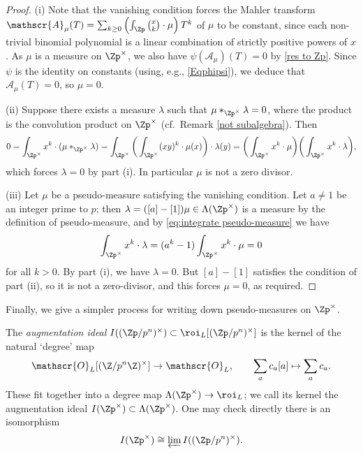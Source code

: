 \documentclass[a4paper,10pt, english, reqno]{smfart}
\numberwithin{equation}{section}
\begin{document}
\begin{proof}
	(i) Note that the vanishing condition forces the Mahler transform $\mathscr{A}_\mu(T) = \sum_{k \geq 0} \left( \int_{\Zp} {x \choose k} \cdot \mu \right) T^k$ of $\mu$ to be constant, since each non-trivial binomial polynomial is a linear combination of strictly positive powers of $x$. As $\mu$ is a measure on $\Zp^\times$, we also have $\psi(\mathscr{A}_\mu)(T) = 0$ by \eqref{res to Zp}. Since $\psi$ is the identity on constants (using, e.g., \eqref{Eqphipsi}), we deduce that $\mathscr{A}_\mu(T) = 0$, so $\mu = 0$.

	
	(ii) Suppose there exists a measure $\lambda$ such that $\mu *_{\Zp^\times} \lambda = 0$, where the product is the convolution product on $\Zp^\times$ (cf.\ Remark \ref{not subalgebra}). Then
	\[0 = \int_{\Zp^\times}x^k \cdot (\mu *_{\Zp^\times} \lambda) = \int_{\Zp^\times} \bigg( \int_{\Zp^\times} (xy)^k \cdot \mu(x) \bigg) \cdot \lambda(y) = \bigg(\int_{\Zp^\times}x^k \cdot\mu \bigg) \bigg( \int_{\Zp^\times}x^k \cdot\lambda \bigg),\]
	which forces $\lambda = 0$ by part (i). In particular $\mu$ is not a zero divisor.

	(iii) Let $\mu$ be a pseudo-measure satisfying the vanishing condition. Let $a \neq 1$ be an integer prime to $p$; then  $\lambda = ([a] - [1])\mu \in \Lambda(\Zp^\times)$ is a measure by the definition of pseudo-measure, and by \eqref{eq:integrate pseudo-measure} we have
	\[
	\int_{\Zp^\times} x^k \cdot \lambda = (a^k-1) \int_{\Zp^\times} x^k \cdot \mu = 0
	\]
	for all $k > 0$. By part (i), we have $\lambda = 0$. But $[a] - [1]$ satisfies the condition of part (ii), so it is not a zero-divisor, and this forces $\mu = 0$, as required.
\end{proof}

Finally, we give a simpler process for writing down pseudo-measures on $\Zp^\times$. 

\begin{definition} \label{DefAugmentationIdealFiniteLevel}
	The \emph{augmentation ideal} $I((\Zp/p^n)^\times) \subset \roi_L[(\Zp/p^n)^\times]$ is the kernel of the natural `degree' map 
 \[
    \mathscr{O}_L[(\Z/p^n\Z)^\times] \to \mathscr{O}_L, \qquad \sum_a c_a[a] \mapsto \sum_a c_a.
\]
These fit together into a degree map $\Lambda(\Zp^\times) \to \roi_L$; we call its kernel the augmentation ideal $I(\Zp^\times) \subset \Lambda(\Zp^\times)$. One may check directly there is an isomorphism
\[
I(\Zp^\times) \cong \varprojlim I((\Zp/p^n)^\times).
\]
\end{definition}
\end{document}
